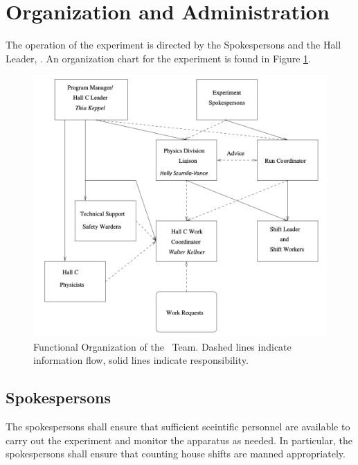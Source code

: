 \documentclass[10pt]{article}
\begin{document}
\section{ Organization  and Administration}

The operation of the experiment is directed by the Spokespersons and the Hall
Leader, \HALLLEADER. An organization chart for the experiment is
found in Figure \ref{HALLCHART}.

\begin{figure}
\includegraphics[width=\textwidth]{coo_HallCorg}
%
%
%
%
\caption[Dummy caption.]{Functional Organization of the \HALL\ Team. Dashed
lines indicate information flow, solid lines indicate responsibility.}
\label{HALLCHART}
\end{figure}

\subsection{Spokespersons}
The spokespersons shall ensure that sufficient sceintific
personnel are available to
carry out the experiment and monitor the apparatus as needed.
In particular, the spokespersons shall ensure that counting house
shifts are manned appropriately.
\end{document}
